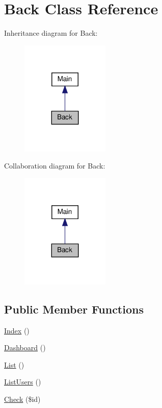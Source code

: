 \hypertarget{class_src_1_1_controllers_1_1_back}{}\section{Back Class Reference}
\label{class_src_1_1_controllers_1_1_back}


Inheritance diagram for Back\+:
\nopagebreak
\begin{figure}[H]
\begin{center}
\leavevmode
\includegraphics[width=119pt]{class_src_1_1_controllers_1_1_back__inherit__graph}
\end{center}
\end{figure}


Collaboration diagram for Back\+:
\nopagebreak
\begin{figure}[H]
\begin{center}
\leavevmode
\includegraphics[width=119pt]{class_src_1_1_controllers_1_1_back__coll__graph}
\end{center}
\end{figure}
\subsection*{Public Member Functions}
\begin{DoxyCompactItemize}
\item 
\hyperlink{class_src_1_1_controllers_1_1_back_ac36db983080e1b0934908febca5de2d9}{Index} ()
\item 
\hyperlink{class_src_1_1_controllers_1_1_back_a405a66825259e2e811a2011a61c2beff}{Dashboard} ()
\item 
\hyperlink{class_src_1_1_controllers_1_1_back_a17e6c90f14225bdac5c65ed915b0a2f6}{List} ()
\item 
\hyperlink{class_src_1_1_controllers_1_1_back_abfd4f6736a8cd4dc4fa1e012996f4a23}{List\+Users} ()
\item 
\hyperlink{class_src_1_1_controllers_1_1_back_a384a1ec9e22b88a73de48023bb2bbf4f}{Check} (\$id)
\end{DoxyCompactItemize}
